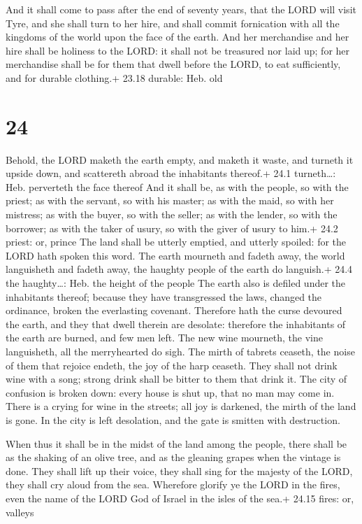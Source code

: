  And it shall come to pass after the end of seventy
years, that the LORD will visit Tyre, and she shall turn to her hire,
and shall commit fornication with all the kingdoms of the world upon the
face of the earth.  And her merchandise and her hire shall
be holiness to the LORD: it shall not be treasured nor laid up; for her
merchandise shall be for them that dwell before the LORD, to eat
sufficiently, and for durable clothing.+ 23.18 durable: Heb. old

\hypertarget{section-23}{%
\section{24}\label{section-23}}

 Behold, the LORD maketh the earth empty, and maketh it
waste, and turneth it upside down, and scattereth abroad the inhabitants
thereof.+ 24.1 turneth\ldots: Heb. perverteth the face thereof
 And it shall be, as with the people, so with the priest; as
with the servant, so with his master; as with the maid, so with her
mistress; as with the buyer, so with the seller; as with the lender, so
with the borrower; as with the taker of usury, so with the giver of
usury to him.+ 24.2 priest: or, prince  The land shall be
utterly emptied, and utterly spoiled: for the LORD hath spoken this
word.  The earth mourneth and fadeth away, the world
languisheth and fadeth away, the haughty people of the earth do
languish.+ 24.4 the haughty\ldots: Heb. the height of the people
 The earth also is defiled under the inhabitants thereof;
because they have transgressed the laws, changed the ordinance, broken
the everlasting covenant.  Therefore hath the curse devoured
the earth, and they that dwell therein are desolate: therefore the
inhabitants of the earth are burned, and few men left.  The
new wine mourneth, the vine languisheth, all the merryhearted do sigh.
 The mirth of tabrets ceaseth, the noise of them that
rejoice endeth, the joy of the harp ceaseth.  They shall not
drink wine with a song; strong drink shall be bitter to them that drink
it.  The city of confusion is broken down: every house is
shut up, that no man may come in.  There is a crying for
wine in the streets; all joy is darkened, the mirth of the land is gone.
 In the city is left desolation, and the gate is smitten
with destruction.

 When thus it shall be in the midst of the land among the
people, there shall be as the shaking of an olive tree, and as the
gleaning grapes when the vintage is done.  They shall lift
up their voice, they shall sing for the majesty of the LORD, they shall
cry aloud from the sea.  Wherefore glorify ye the LORD in
the fires, even the name of the LORD God of Israel in the isles of the
sea.+ 24.15 fires: or, valleys

